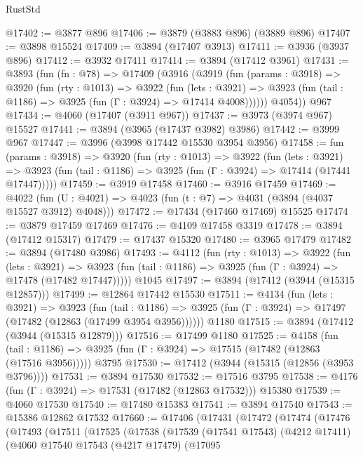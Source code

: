 \begin{lexlean}{RustStd}
\begin{coremodule}
@17402 := @3877 @896
@17406 := @3879 (@3883 @896) (@3889 @896)
@17407 := @3898 @15524
@17409 := @3894 (@17407 @3913)
@17411 := @3936 (@3937 @896)
@17412 := @3932 @17411
@17414 := @3894 (@17412 @3961)
@17431 := @3893
    (fun (fn : @78) =>
    @17409
      (@3916
        (@3919
          (fun (params : @3918) =>
          @3920
            (fun (rty : @1013) =>
            @3922
              (fun (lets : @3921) =>
              @3923 (fun (tail : @1186) => @3925 (fun (Γ : @3924) => @17414 @4008))))))
        @4054))
    @967
@17434 := @4060 (@17407 (@3911 @967))
@17437 := @3973 (@3974 @967) @15527
@17441 := @3894 (@3965 (@17437 @3982) @3986)
@17442 := @3999 @967
@17447 := @3996 (@3998 @17442 @15530 @3954 @3956)
@17458 := fun (params : @3918) =>
  @3920
    (fun (rty : @1013) =>
    @3922
      (fun (lets : @3921) =>
      @3923 (fun (tail : @1186) => @3925 (fun (Γ : @3924) => @17414 (@17441 @17447)))))
@17459 := @3919 @17458
@17460 := @3916 @17459
@17469 := @4022
    (fun (U : @4021) => @4023 (fun (t : @7) => @4031 (@3894 (@4037 @15527 @3912) @4048)))
@17472 := @17434 (@17460 @17469) @15525
@17474 := @3879 @17459 @17469
@17476 := @4109 @17458 @3319
@17478 := @3894 (@17412 @15317)
@17479 := @17437 @15320
@17480 := @3965 @17479
@17482 := @3894 (@17480 @3986)
@17493 := @4112
    (fun (rty : @1013) =>
    @3922
      (fun (lets : @3921) =>
      @3923 (fun (tail : @1186) => @3925 (fun (Γ : @3924) => @17478 (@17482 @17447)))))
    @1045
@17497 := @3894 (@17412 (@3944 (@15315 @12857)))
@17499 := @12864 @17442 @15530
@17511 := @4134
    (fun (lets : @3921) =>
    @3923
      (fun (tail : @1186) =>
      @3925 (fun (Γ : @3924) => @17497 (@17482 (@12863 (@17499 @3954 @3956))))))
    @1180
@17515 := @3894 (@17412 (@3944 (@15315 @12879)))
@17516 := @17499 @1180
@17525 := @4158
    (fun (tail : @1186) => @3925 (fun (Γ : @3924) => @17515 (@17482 (@12863 (@17516 @3956)))))
    @3795
@17530 := @17412 (@3944 (@15315 (@12856 (@3953 @3796))))
@17531 := @3894 @17530
@17532 := @17516 @3795
@17538 := @4176 (fun (Γ : @3924) => @17531 (@17482 (@12863 @17532))) @15380
@17539 := @4060 @17530
@17540 := @17480 @15383
@17541 := @3894 @17540
@17543 := @15386 @12862 @17532
@17660 := @17406
    (@17431
      (@17472
        (@17474
          (@17476
            (@17493
              (@17511
                (@17525
                  (@17538
                    (@17539
                      (@17541 @17543)
                      (@4212 @17411)
                      (@4060
                        @17540
                        @17543
                        (@4217 @17479)
                        (@17095

\end{coremodule}
\end{lexlean}
